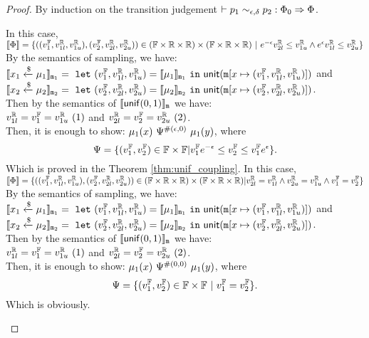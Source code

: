 \documentclass[a4paper,11pt]{article}
\begin{document}
\begin{proof}
By induction on the transition judgement $\vdash p_1	
\sim_{\epsilon, \delta} 
p_2 :
\Phi_0 \Rightarrow \Phi $.
\begin{itemize}
	In this case, 
	$\llbracket \Phi \rrbracket = 
	\{((v^{\mathbb{F}}_1, v^{\mathbb{R}}_{1l}, v^{\mathbb{R}}_{1u}), (v^{\mathbb{F}}_2, v^{\mathbb{R}}_{2l}, v^{\mathbb{R}}_{2u})) 
	\in (\mathbb{F} \times \mathbb{R} \times \mathbb{R}) \times (\mathbb{F} \times \mathbb{R} \times \mathbb{R})
	~|~
	e^{-\epsilon} v^{\mathbb{R}}_{2l} \leq v^{\mathbb{R}}_{1u}
	\land
	e^{\epsilon} v^{\mathbb{R}}_{1l} \leq v^{\mathbb{R}}_{2u}
	\}$
	\\
	By the semantics of sampling, we have:\\
	$\llbracket x_1 \xleftarrow{\$} \mu_1 \rrbracket_{\mathtt{m}_1} = 
	~\mathtt{let}~ (v^{\mathbb{F}}_1, v^{\mathbb{R}}_{1l}, v^{\mathbb{R}}_{1u}) 
	= \llbracket \mu_1 \rrbracket_{\mathtt{m}_1} 
	~\mathtt{in}~ 
	\mathsf{unit}(\mathtt{m}[x \mapsto (v^{\mathbb{F}}_1, v^{\mathbb{R}}_{1l}, v^{\mathbb{R}}_{1u})])
	$ and 
	$\llbracket x_2 \xleftarrow{\$} \mu_2 \rrbracket_{\mathtt{m}_2} = 
	~\mathtt{let}~ (v^{\mathbb{F}}_2, v^{\mathbb{R}}_{2l}, v^{\mathbb{R}}_{2u}) 
	= \llbracket \mu_2 \rrbracket_{\mathtt{m}_2} 
	~\mathtt{in}~ 
	\mathsf{unit}(\mathtt{m}[x \mapsto (v^{\mathbb{F}}_2, v^{\mathbb{R}}_{2l}, v^{\mathbb{R}}_{2u})])
	$. \\
	Then by the semantics of $\llbracket \mathsf{unif}(0, 1) \rrbracket_{\mathtt{m}}$ we have:
	\\
	$ v^{\mathbb{R}}_{1l} = v^{\mathbb{F}}_1 = v^{\mathbb{R}}_{1u} ~ (1)$ 
	and
	$ v^{\mathbb{R}}_{2l} = v^{\mathbb{F}}_2 = v^{\mathbb{R}}_{2u} ~ (2)$.
	\\
	Then, it is enough to show:
	${\mu_1}(x) ~ \Psi^{\#(\epsilon, 0)} ~ {\mu_1}(y)$, where
	\[
		\Psi = \{(v^{\mathbb{F}}_1, v^{\mathbb{F}}_2) \in \mathbb{F} \times \mathbb{F}
		| 
		v^{\mathbb{F}}_1 e^{-\epsilon} 
		\leq v^{\mathbb{F}}_2
		\leq v^{\mathbb{F}}_1 e^{\epsilon} \}.
	\]
	Which is proved in the Theorem \ref{thm:unif_coupling}.
	In this case, 
	$\llbracket \Phi \rrbracket = 
	\{((v^{\mathbb{F}}_1, v^{\mathbb{R}}_{1l}, v^{\mathbb{R}}_{1u}), (v^{\mathbb{F}}_2, v^{\mathbb{R}}_{2l}, v^{\mathbb{R}}_{2u})) 
	\in (\mathbb{F} \times \mathbb{R} \times \mathbb{R}) \times (\mathbb{F} \times \mathbb{R} \times \mathbb{R})
	|
	v^{\mathbb{R}}_{2l} = v^{\mathbb{R}}_{1l}
	\land
	v^{\mathbb{R}}_{2u} = v^{\mathbb{R}}_{1u}
	\land
	v^{\mathbb{F}}_1 = v^{\mathbb{F}}_2
	\}$
	\\
	By the semantics of sampling, we have:\\
	$\llbracket x_1 \xleftarrow{\$} \mu_1 \rrbracket_{\mathtt{m}_1} = 
	~\mathtt{let}~ (v^{\mathbb{F}}_1, v^{\mathbb{R}}_{1l}, v^{\mathbb{R}}_{1u}) 
	= \llbracket \mu_1 \rrbracket_{\mathtt{m}_1} 
	~\mathtt{in}~ 
	\mathsf{unit}(\mathtt{m}[x \mapsto (v^{\mathbb{F}}_1, v^{\mathbb{R}}_{1l}, v^{\mathbb{R}}_{1u})])
	$ and 
	$\llbracket x_2 \xleftarrow{\$} \mu_2 \rrbracket_{\mathtt{m}_2} = 
	~\mathtt{let}~ (v^{\mathbb{F}}_2, v^{\mathbb{R}}_{2l}, v^{\mathbb{R}}_{2u}) 
	= \llbracket \mu_2 \rrbracket_{\mathtt{m}_2} 
	~\mathtt{in}~ 
	\mathsf{unit}(\mathtt{m}[x \mapsto (v^{\mathbb{F}}_2, v^{\mathbb{R}}_{2l}, v^{\mathbb{R}}_{2u})])
	$. \\
	Then by the semantics of $\llbracket \mathsf{unif}(0, 1) \rrbracket_{\mathtt{m}}$ we have:
	\\
	$ v^{\mathbb{R}}_{1l} = v^{\mathbb{F}}_1 = v^{\mathbb{R}}_{1u} ~ (1)$ 
	and
	$ v^{\mathbb{R}}_{2l} = v^{\mathbb{F}}_2 = v^{\mathbb{R}}_{2u} ~ (2)$.
	\\
	Then, it is enough to show:
	${\mu_1}(x) ~ \Psi^{\#(0, 0)} ~ {\mu_1}(y)$, where
	\[
		\Psi = \{(v^{\mathbb{F}}_1, v^{\mathbb{F}}_2) \in \mathbb{F} \times \mathbb{F}
		~| ~
		v^{\mathbb{F}}_1 = v^{\mathbb{F}}_2 \}.
	\]
	Which is obviously.
	\end{itemize}
\end{proof}
\end{document}
